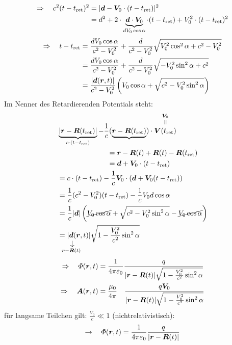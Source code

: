 \begin{enumerate}[i)]
\begin{tikzpicture}
	\end{tikzpicture}
	\begin{align*}
	\Rightarrow \quad c^2(t - t_{\tx{ret}})^2 &= | \vec{d} - \vec{V}_0 \cdot (t - t_{\tx{ret}})|^2\\
	&= d^2 + 2 \cdot \ub{\vec{d} \cdot \vec{V}_0}_{d V_0 \cos \alpha} \cdot (t - t_{\tx{ret}}) + V_0^2 \cdot (t-t_{\tx{ret}})^2
	\end{align*}
	\begin{align*}
	\Rightarrow \quad t - t_{\tx{ret}} &= \frac{d V_0 \cos \alpha}{c^2 - V_0^2} + \frac{d}{c^2 - V_0^2} \sqrt{V_0^2 \cos^2 \alpha + c^2 - V_0^2} \\
	&= \frac{d V_0 \cos \alpha}{c^2 - V_0^2} + \frac{d}{c^2 - V_0^2} \sqrt{- V_0^2 \sin^2 \alpha + c^2}\\
	&= \frac{|\vec{d}(\vec{r},t)|}{c^2 - V_0^2} \left(V_0 \cos \alpha + \sqrt{c^2 - V_0^2 \sin^2 \alpha}\right)
	\end{align*}
	Im Nenner des Retardierenden Potentials steht:
	\begin{align*}
	& \ub{|\vec{r} - \vec{R}(t_{\tx{ret}})|}_{c \cdot ( t - t_{\tx{ret}})} - \frac{1}{c} (\ub{\vec{r} - \vec{R}(t_{\tx{ret}})}) \cdot \equaltoup{\vec{V}(t_{\tx{ret}})}{\vec{V}_0}\\
	& \quad \qquad \qquad \qquad = \vec{r} - \vec{R}(t) + \vec{R}(t) - \vec{R}(t_{\tx{ret}}) \\
	& \quad \qquad \qquad \qquad = \vec{d} + \vec{V}_0 \cdot (t - t_{\tx{ret}})\\
	&= c \cdot (t - t_{\tx{ret}}) - \frac{1}{c} \vec{V}_0 \cdot (\vec{d} + \vec{V}_0 (t - t_{\tx{ret}}))\\
	&= \frac{1}{c} (c^2 - V_0^2) (t - t_{\tx{ret}}) - \frac{1}{c} V_0 d \cos \alpha\\
	&= \frac{1}{c} |\vec{d}| \left(\cancel{ V_0 \cos \alpha} + \sqrt{c^2 - V_0^2 \sin^2 \alpha} - \cancel{ V_0 \cos \alpha}\right)\\
	&= |\custo{\rightarrow}{\vec{d}}{\mathclap{\vec{r} - \vec{R}(t)}}(\vec{r},t)| \sqrt{1 - \frac{V_0^2}{c^2} \sin^2 \alpha}
	\end{align*}
	\begin{align*}
	\Rightarrow \quad \Phi(\vec{r},t) &= \kq \frac{q}{|\vec{r} - \vec{R}(t)| \sqrt{1 - \frac{V_0^2}{c^2} \sin^2 \alpha}}\\
	\Rightarrow \quad \vec{A}(\vec{r},t) &= \frac{\mu_0}{4 \pi} \ \ \ \frac{q \vec{V}_0}{|\vec{r} - \vec{R}(t)| \sqrt{1 - \frac{V_0^2}{c^2} \sin^2 \alpha}}
	\end{align*}
	für langsame Teilchen gilt: $ \frac{V_0}{c} \ll 1 $ (nichtrelativistisch):
	\begin{equation*}
	\rightarrow \quad \Phi(\vec{r},t) = \kq \frac{q}{|\vec{r} - \vec{R}(t)|}
	\end{equation*}
\end{enumerate}

